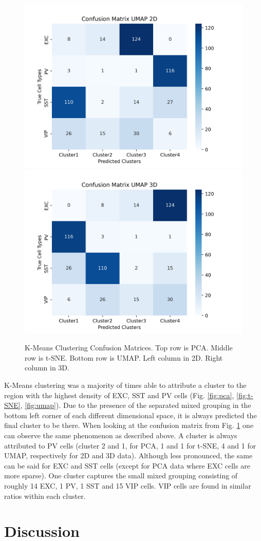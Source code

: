\documentclass{IEEEtran}
\begin{document}
\begin{figure}[h!]
  \includegraphics[width=0.45\columnwidth]{figures/Confusion Matrix UMAP 2D.png}
  \includegraphics[width=0.45\columnwidth]{figures/Confusion Matrix UMAP 3D.png}
  \caption{K-Means Clustering Confusion Matrices. Top row is PCA. Middle row is t-SNE. Bottom row is UMAP. Left column in 2D. Right column in 3D.}%
  \label{fig:unsupervised_confusion_matrices}
\end{figure}

K-Means clustering was a majority of times able to attribute a cluster to the region with the highest density of EXC, SST and PV cells (Fig. \ref{fig:pca}, \ref{fig:t-SNE}, \ref{fig:umap}). Due to the presence of the separated mixed grouping in the bottom left corner of each different dimensional space, it is always predicted the final cluster to be there.
When looking at the confusion matrix from Fig. \ref{fig:unsupervised_confusion_matrices} one can observe the same phenomenon as described above. A cluster is always attributed to PV cells (cluster 2 and 1, for PCA, 1 and 1 for t-SNE, 4 and 1 for UMAP, respectively for 2D and 3D data). Although less pronounced, the same can be said for EXC and SST cells (except for PCA data where EXC cells are more sparse). One cluster captures the small mixed grouping consisting of roughly 14 EXC, 1 PV, 1 SST and 15 VIP cells. VIP cells are found in similar ratios within each cluster.


\section{Discussion}
\end{document}
